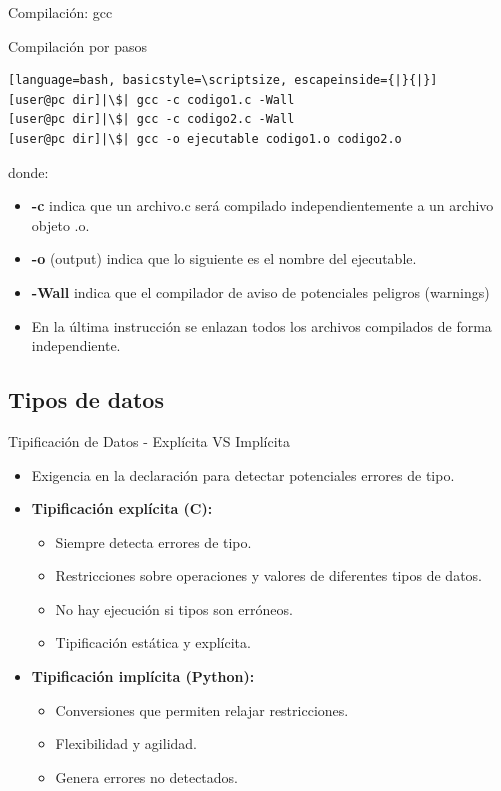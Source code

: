 \documentclass{beamer}
\begin{document}
\begin{frame}[fragile]{Compilación: gcc}

\begin{exampleblock}{Compilación por pasos}
\begin{lstlisting}[language=bash, basicstyle=\scriptsize, escapeinside={|}{|}]
[user@pc dir]|\$| gcc -c codigo1.c -Wall
[user@pc dir]|\$| gcc -c codigo2.c -Wall
[user@pc dir]|\$| gcc -o ejecutable codigo1.o codigo2.o 
\end{lstlisting}
\end{exampleblock}
{\footnotesize
donde:
\begin{itemize}
\item \textbf{-c} indica que un archivo.c será compilado independientemente a un archivo objeto .o.
\item \textbf{-o} (output) indica que lo siguiente es el nombre del ejecutable. 
\item \textbf{-Wall} indica que el compilador de aviso de potenciales peligros (warnings)
\item En la última instrucción se enlazan todos los archivos compilados de forma independiente. 
\end{itemize}
}
\end{frame}


\subsection{Tipos de datos}
\begin{frame}[fragile]{Tipificación de Datos - Explícita VS Implícita}
\begin{itemize}
	\item Exigencia en la declaración para detectar potenciales errores de tipo.
	\item \textbf{Tipificación explícita (C): } 
	\begin{itemize}
		\item Siempre detecta errores de tipo. 
		\item Restricciones sobre operaciones y valores de diferentes tipos de datos.
		\item No hay ejecución si tipos son erróneos. 
		\item Tipificación estática y explícita.
	\end{itemize}
	\item \textbf{Tipificación implícita (Python): } 
	\begin{itemize}
		\item Conversiones que permiten relajar restricciones.
		\item Flexibilidad y agilidad.
		\item Genera errores no detectados.
	\end{itemize}
	
\end{itemize}
\end{frame}
\end{document}
